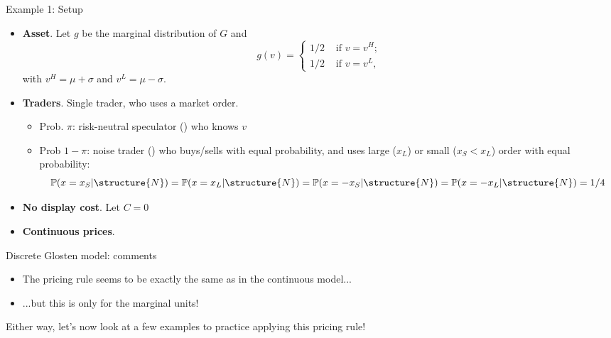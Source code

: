 \documentclass[english,10pt
,aspectratio=169
]{beamer}
\begin{document}
\begin{frame}{Example 1: Setup} 
	\begin{itemize}
		\item \textbf{Asset}. Let $g$ be the marginal distribution of $G$ and
		\[
		g(v)=\left\{ \begin{aligned}
		1/2  & \text{ if } v=v^H; \\
		1/2 & \text{ if } v=v^L,
		\end{aligned}
		\right.
		\]
		with $v^{H}=\mu + \sigma $ and $v^{L}= \mu - \sigma $.
		\item \textbf{Traders}. Single trader, who uses a market order.
		\begin{itemize}
			\item Prob. $\pi$: risk-neutral speculator () who knows $v$
			\item Prob $1-\pi$: noise trader ()  who buys/sells with equal probability, and uses large ($x_L$) or small ($x_S<x_L$) order with equal probability:
			$$
			\mathbb{P}(x=x_S|\structure{N})= \mathbb{P}(x=x_L|\structure{N})=\mathbb{P}(x=-x_S|\structure{N})=\mathbb{P}(x=-x_L|\structure{N})=1/4
			$$
		\end{itemize}
		\item \textbf{No display cost}. Let $C=0$
		\item \textbf{Continuous prices}.
	\end{itemize}
\end{frame}


\begin{frame}{Discrete Glosten model: comments}
	\begin{itemize}
		\item The pricing rule seems to be exactly the same as in the continuous model...
		\item ...but this is only for the marginal units! 
	\end{itemize}
	\bigskip 
	Either way, let's now look at a few examples to practice applying this pricing rule!
\end{frame}
\end{document}
